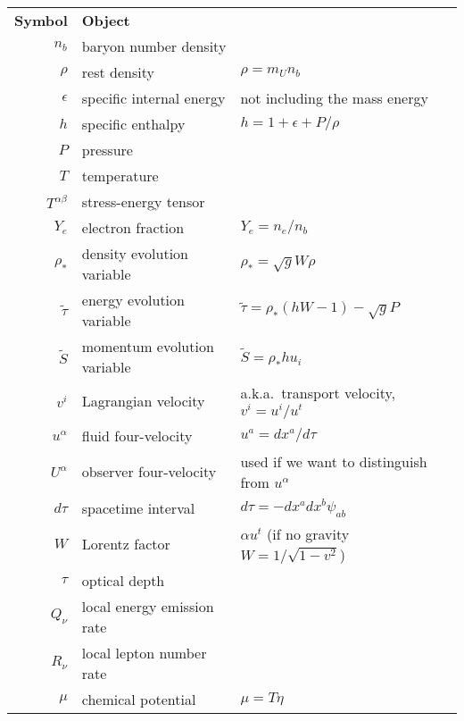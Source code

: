 \begin{table}
  \centering
  \begin{tabular}{rll}
    \textbf{Symbol}       & \textbf{Object}           & \\%
    $n_b$                 & baryon number density     & \\
    $\rho$                & rest density              & $\rho=m_U n_b $ \\
    $\epsilon$            & specific internal energy  & not including the mass energy \\
    $h$                   & specific enthalpy         & $h=1+\epsilon+P/\rho$\\
    $P$                   & pressure                  & \\
    $T$                   & temperature               & \\
    $T^{\alpha \beta}$    & stress-energy tensor      & \\
    $Y_e$                 & electron fraction         & $Y_e=n_e/n_b$\\
    $\rho_*$              & density evolution variable& $\rho_*=\sqrt{g}W\rho$ \\
    $\tilde\tau$          & energy evolution variable & $\tilde\tau=\rho_*(hW-1)-\sqrt{g}P$ \\
    $\tilde S$            & momentum evolution variable & $\tilde S=\rho_*hu_i$\\
    $v^i$                 & Lagrangian velocity       & a.k.a.\ transport velocity, $v^i=u^i/u^t$ \\
    $u^\alpha$            & fluid four-velocity       & $u^a=dx^a/d\tau$ \\
    $U^\alpha$            & observer four-velocity    & used if we want to distinguish from $u^\alpha$ \\
    $d\tau$               & spacetime interval        & $d\tau=-dx^a dx^b \psi_{ab}$ \\
    $W$                   & Lorentz factor            & $\alpha u^t$ (if no gravity $W=1/\sqrt{1-v^2}$) \\
    $\tau$                & optical depth             & \\
    $Q_\nu$               & local energy emission rate& \\
    $R_\nu$               & local lepton number rate  & \\
    $\mu$                 & chemical potential        & $\mu=T\eta$ \\

\end{tabular}
\end{table}
